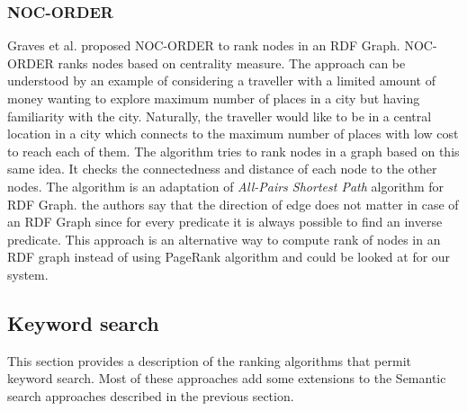 \documentclass{article}
\begin{document}
    \subsubsection{NOC-ORDER}
    Graves et al.\cite{graves08} proposed NOC-ORDER to rank nodes in an RDF Graph. NOC-ORDER ranks nodes based on centrality measure. The approach can be understood by an example of considering a traveller with a limited amount of money wanting to explore maximum number of places in a city but having familiarity with the city. Naturally, the traveller would like to be in a central location in a city which connects to the maximum number of places with low cost to reach each of them. The algorithm tries to rank nodes in a graph based on this same idea. It checks the connectedness and distance of each node to the other nodes. The algorithm is an adaptation of \emph{All-Pairs Shortest Path} algorithm for RDF Graph. the authors say that the direction of edge does not matter in case of an RDF Graph since for every predicate it is always possible to find an inverse predicate.  This approach is an alternative way to compute rank of nodes in an RDF graph instead of using PageRank algorithm and could be looked at for our system.

    \subsection{Keyword search}
    This section provides a description of the ranking algorithms that permit keyword search. Most of these approaches add some extensions to the Semantic search approaches described in the previous section.
\end{document}
